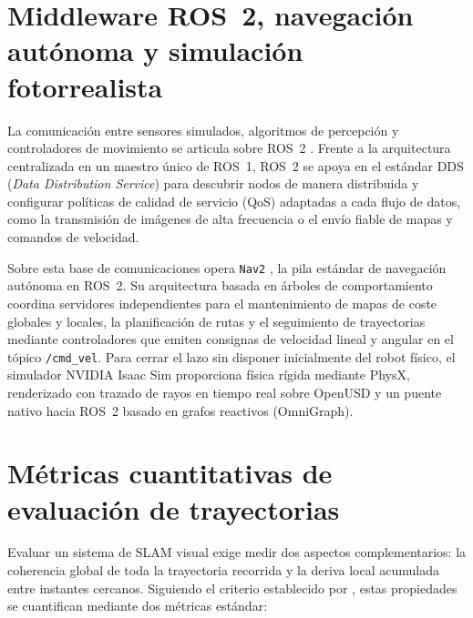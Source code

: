 
\section{Middleware ROS~2, navegación autónoma y simulación fotorrealista}
\label{sec:ros2_nav2_isaac}

La comunicación entre sensores simulados, algoritmos de percepción y controladores de movimiento se articula sobre ROS~2 \parencite{macenski2022ros2}. Frente a la arquitectura centralizada en un maestro único de ROS~1, ROS~2 se apoya en el estándar DDS (\textit{Data Distribution Service}) para descubrir nodos de manera distribuida y configurar políticas de calidad de servicio (QoS) adaptadas a cada flujo de datos, como la transmisión de imágenes de alta frecuencia o el envío fiable de mapas y comandos de velocidad.

Sobre esta base de comunicaciones opera \texttt{Nav2} \parencite{macenski2020nav2}, la pila estándar de navegación autónoma en ROS~2. Su arquitectura basada en árboles de comportamiento coordina servidores independientes para el mantenimiento de mapas de coste globales y locales, la planificación de rutas y el seguimiento de trayectorias mediante controladores que emiten consignas de velocidad lineal y angular en el tópico \texttt{/cmd\_vel}. Para cerrar el lazo sin disponer inicialmente del robot físico, el simulador NVIDIA Isaac Sim \parencite{nvidia_isaacsim} proporciona física rígida mediante PhysX, renderizado con trazado de rayos en tiempo real sobre OpenUSD y un puente nativo hacia ROS~2 basado en grafos reactivos (OmniGraph).


\section{Métricas cuantitativas de evaluación de trayectorias}
\label{sec:metricas_evaluacion}

Evaluar un sistema de SLAM visual exige medir dos aspectos complementarios: la coherencia global de toda la trayectoria recorrida y la deriva local acumulada entre instantes cercanos. Siguiendo el criterio establecido por \textcite{sturm2012benchmark}, estas propiedades se cuantifican mediante dos métricas estándar:

